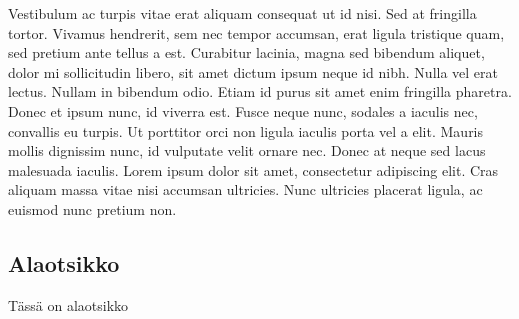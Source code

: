 \documentclass[a4paper]{article}
\begin{document}
Vestibulum ac turpis vitae erat aliquam consequat ut id nisi. Sed at fringilla tortor. Vivamus hendrerit, sem nec tempor accumsan, erat ligula tristique quam, sed pretium ante tellus a est. Curabitur lacinia, magna sed bibendum aliquet, dolor mi sollicitudin libero, sit amet dictum ipsum neque id nibh. Nulla vel erat lectus. Nullam in bibendum odio. Etiam id purus sit amet enim fringilla pharetra. Donec et ipsum nunc, id viverra est. Fusce neque nunc, sodales a iaculis nec, convallis eu turpis. Ut porttitor orci non ligula iaculis porta vel a elit. Mauris mollis dignissim nunc, id vulputate velit ornare nec. Donec at neque sed lacus malesuada iaculis. Lorem ipsum dolor sit amet, consectetur adipiscing elit. Cras aliquam massa vitae nisi accumsan ultricies. Nunc ultricies placerat ligula, ac euismod nunc pretium non.

\subsection{Alaotsikko}

Tässä on alaotsikko

\end{document}
